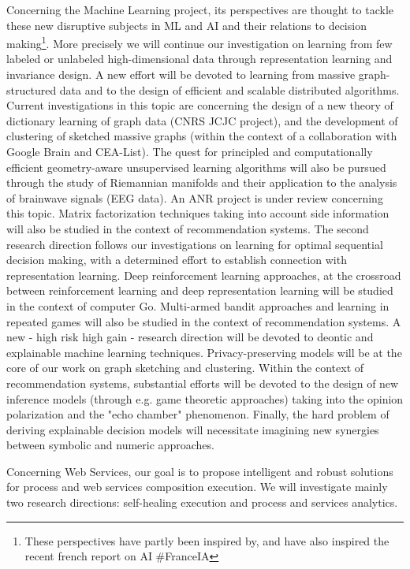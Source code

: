 Concerning the Machine Learning project, its perspectives are thought to tackle these new disruptive subjects in ML and AI and their relations to decision making\footnote{These perspectives have partly been inspired by, and have also inspired the recent french report on AI \#FranceIA}. More precisely we will continue our investigation on learning from few labeled or unlabeled high-dimensional data through representation learning and invariance design.  A new effort will be devoted to learning from massive graph-structured data and to the design of efficient and scalable distributed algorithms. Current investigations in this topic are concerning the design of a new theory of dictionary learning of graph data (CNRS JCJC project), and the development of clustering of sketched massive graphs (within the context of a collaboration  with Google Brain and CEA-List). The quest for principled and computationally efficient geometry-aware unsupervised learning algorithms will also be pursued through the study of Riemannian manifolds and their application to the analysis of brainwave signals (EEG data). An ANR project is under review concerning this topic. Matrix factorization techniques taking into account side information will also be studied in the context of recommendation systems. The second research direction follows our investigations on learning for   optimal sequential decision making, with a determined effort to establish connection with representation learning. Deep reinforcement learning approaches, at the crossroad between reinforcement learning and deep representation learning will be studied in the context of computer Go. Multi-armed bandit approaches and learning in repeated games will also be studied in the context of recommendation systems.  
A new - high risk high gain - research direction will be devoted to deontic and explainable machine learning techniques. Privacy-preserving models will be at the core of our work on graph sketching and clustering. Within the context of recommendation systems, substantial efforts will be devoted to the design of new inference models (through e.g. game theoretic approaches) taking into the opinion polarization and the "echo chamber"  phenomenon. Finally, the hard problem of deriving explainable decision models will necessitate imagining new synergies between symbolic and numeric approaches.

Concerning Web Services, our  goal is to propose intelligent and robust solutions for process and web services composition execution. We will investigate mainly two research directions: self-healing execution and process and services analytics.

